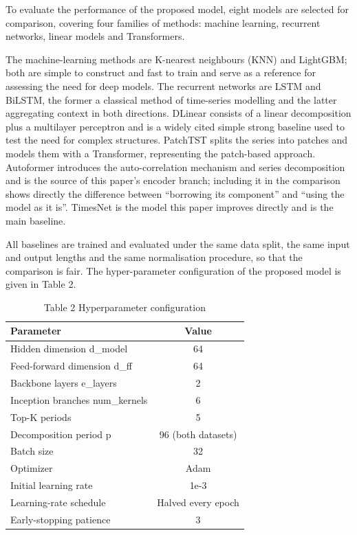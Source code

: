 \documentclass{iopjournal}
\begin{document}
To evaluate the performance of the proposed model, eight models are selected for comparison, covering four families of methods: machine learning, recurrent networks, linear models and Transformers.

The machine-learning methods are K-nearest neighbours (KNN) and LightGBM; both are simple to construct and fast to train and serve as a reference for assessing the need for deep models. The recurrent networks are LSTM and BiLSTM, the former a classical method of time-series modelling and the latter aggregating context in both directions. DLinear consists of a linear decomposition plus a multilayer perceptron and is a widely cited simple strong baseline used to test the need for complex structures. PatchTST splits the series into patches and models them with a Transformer, representing the patch-based approach. Autoformer introduces the auto-correlation mechanism and series decomposition and is the source of this paper's encoder branch; including it in the comparison shows directly the difference between ``borrowing its component'' and ``using the model as it is''. TimesNet is the model this paper improves directly and is the main baseline.

All baselines are trained and evaluated under the same data split, the same input and output lengths and the same normalisation procedure, so that the comparison is fair. The hyper-parameter configuration of the proposed model is given in Table 2.

\begin{table}[htbp]
\caption{Table 2  Hyperparameter configuration}
\centering
\begin{tabular}{l c}
\hline
Parameter & Value \\
\hline
Hidden dimension d\_model & 64 \\
Feed-forward dimension d\_ff & 64 \\
Backbone layers e\_layers & 2 \\
Inception branches num\_kernels & 6 \\
Top-K periods & 5 \\
Decomposition period p & 96 (both datasets) \\
Batch size & 32 \\
Optimizer & Adam \\
Initial learning rate & 1e-3 \\
Learning-rate schedule & Halved every epoch \\
Early-stopping patience & 3 \\
\hline
\end{tabular}
\label{tab2}
\end{table}
\end{document}
